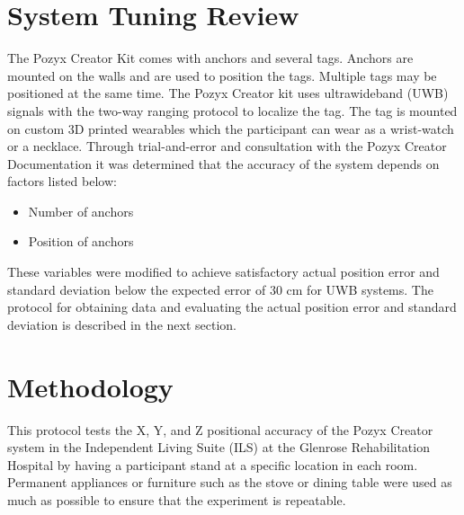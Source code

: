 \section{System Tuning Review}
The Pozyx Creator Kit comes with anchors and several tags. Anchors are mounted 
on the walls and are used to position the tags. Multiple tags may be positioned
at the same time.
The Pozyx Creator kit uses ultrawideband (UWB) signals with the two-way ranging protocol to localize the tag. 
The tag is mounted on custom 3D printed wearables which the participant can wear as 
a wrist-watch or a necklace. Through trial-and-error and consultation with the Pozyx Creator Documentation
\cite{noauthor_hardware_nodate,noauthor_configuration_nodate}
it was determined that the accuracy of the system depends on factors listed below:

\begin{itemize}
    \item Number of anchors
    \item Position of anchors
\end{itemize}

These variables were modified to achieve satisfactory actual position error
and standard deviation below the expected error of 30 cm for UWB systems. The 
protocol for obtaining data and evaluating the actual position error and 
standard deviation is described in the next section.

\section{Methodology}
This protocol tests the X, Y, and Z positional accuracy of the Pozyx Creator system in the Independent
Living Suite (ILS) at the Glenrose Rehabilitation Hospital by having a participant stand at 
a specific location in each room. Permanent appliances or furniture such as the stove
or dining table were used as much as possible to ensure that the experiment is repeatable.

